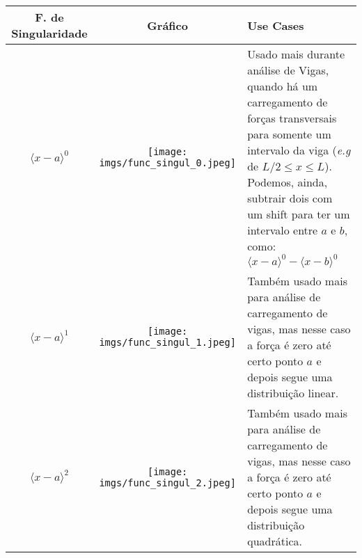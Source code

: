 \documentclass{article}
\begin{document}
            \begin{table}[h]
                \centering
                \begin{tabular}{|c|c|l|} \hline
                    \textbf{F. de Singularidade} & \textbf{Gráfico} & \textbf{Use Cases} \\ \hline
                    $\langle x - a\rangle^0$ & 
                        \begin{minipage}{.3\textwidth}
                            \centering
                            \texttt{[image: imgs/func\_singul\_0.jpeg]}
                        \end{minipage}&
                        \begin{minipage}{.4\textwidth}
                            Usado mais durante análise de Vigas, quando há um carregamento de forças transversais para somente um intervalo da viga (\emph{e.g} de $L/2 \le x \le L$). Podemos,
                            ainda, subtrair dois com um shift para ter um intervalo entre $a$ e $b$, como: $\langle x - a\rangle^0 - \langle x - b\rangle^0$ 
                        \end{minipage}  \\ \hline

                    $\langle x - a\rangle^1$ & 
                        \begin{minipage}{.3\textwidth}
                            \centering
                            \texttt{[image: imgs/func\_singul\_1.jpeg]}
                        \end{minipage}&
                        \begin{minipage}{.4\textwidth}
                            Também usado mais para análise de carregamento de vigas, mas nesse caso a força é zero até certo ponto $a$ e depois segue uma distribuição linear.
                        \end{minipage}  \\ \hline

                    $\langle x - a\rangle^2$ & 
                        \begin{minipage}{.3\textwidth}
                            \centering
                            \texttt{[image: imgs/func\_singul\_2.jpeg]}
                        \end{minipage}&
                        \begin{minipage}{.4\textwidth}
                            Também usado mais para análise de carregamento de vigas, mas nesse caso a força é zero até certo ponto $a$ e depois segue uma distribuição quadrática.
                        \end{minipage}  \\ \hline
                    

\end{tabular}
\end{table}
\end{document}
